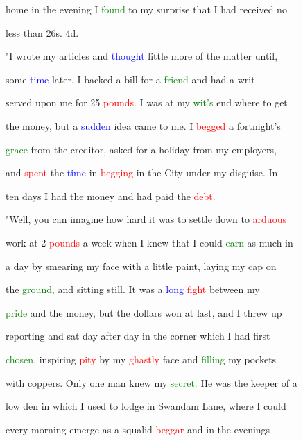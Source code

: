  home in the evening I \textcolor{green}{found} to my \textcolor{BurntOrange}{surprise} that I had received no

 less than 26s. 4d.



 "I wrote my articles and \textcolor{blue}{thought} little more of the matter until,

 some \textcolor{blue}{time} later, I backed a bill for a \textcolor{green}{friend} and had a writ

 \textcolor{BurntOrange}{served} upon me for 25 \textcolor{red}{pounds.} I was at my \textcolor{green}{wit's} end where to get

 the \textcolor{BurntOrange}{money,} but a \textcolor{blue}{sudden} idea came to me. I \textcolor{red}{begged} a fortnight's

 \textcolor{green}{grace} from the creditor, asked for a \textcolor{BurntOrange}{holiday} from my employers,

 and \textcolor{red}{spent} the \textcolor{blue}{time} in \textcolor{red}{begging} in the City under my disguise. In

 ten days I had the \textcolor{BurntOrange}{money} and had paid the \textcolor{red}{debt.}



 "Well, you can imagine how hard it was to settle down to \textcolor{red}{arduous}

 work at 2 \textcolor{red}{pounds} a week when I knew that I could \textcolor{green}{earn} as much in

 a day by smearing my face with a little paint, laying my \textcolor{BurntOrange}{cap} on

 the \textcolor{green}{ground,} and sitting still. It was a \textcolor{blue}{long} \textcolor{red}{fight} between my

 \textcolor{green}{pride} and the \textcolor{BurntOrange}{money,} but the dollars won at last, and I threw up

 reporting and sat day after day in the corner which I had first

 \textcolor{green}{chosen,} \textcolor{BurntOrange}{inspiring} \textcolor{red}{pity} by my \textcolor{red}{ghastly} face and \textcolor{green}{filling} my pockets

 with coppers. Only one man knew my \textcolor{green}{secret.} He was the keeper of a

 low den in which I used to lodge in Swandam Lane, where I could

 every morning emerge as a squalid \textcolor{red}{beggar} and in the evenings

